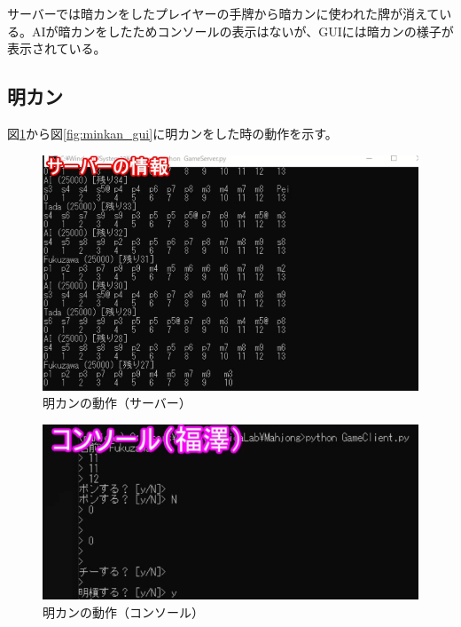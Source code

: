 \documentclass[a4j,titlepage]{jsarticle}
\begin{document}
サーバーでは暗カンをしたプレイヤーの手牌から暗カンに使われた牌が消えている。AIが暗カンをしたためコンソールの表示はないが、GUIには暗カンの様子が表示されている。

\subsection{明カン}
図\ref{fig:minkan_server}から図\ref{fig:minkan_gui}に明カンをした時の動作を示す。

\begin{figure}[H]
  \centering
  \includegraphics[scale = 0.6]{images/minkan_server.png}
  \caption{明カンの動作（サーバー）}
  \label{fig:minkan_server}
\end{figure}

\begin{figure}[H]
  \centering
  \includegraphics[scale = 0.8]{images/minkan_console.png}
  \caption{明カンの動作（コンソール）}
  \label{fig:minkan_console}
\end{figure}
\end{document}
